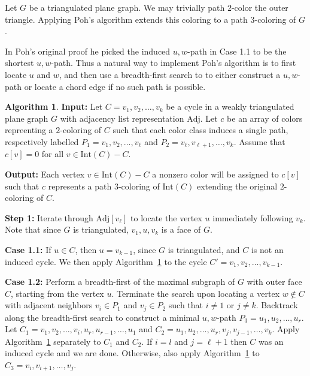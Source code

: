 \documentclass[12pt,letterpaper]{article}
\theoremstyle{plain}
\theoremstyle{definition}
\theoremstyle{break}
\newtheorem{algorithm}[lemma]{Algorithm}     %
\begin{document}
Let $G$ be a triangulated plane graph. We may trivially path $2$-color the outer
triangle. Applying Poh's algorithm extends this coloring to a path $3$-coloring
of $G$.

In Poh's original proof he picked the induced $u,w$-path in Case 1.1 to be the
shortest $u,w$-path.
Thus a natural way to implement Poh's algorithm is to first locate $u$ and $w$,
and then use a breadth-first search to
to either construct a $u,w$-path or locate
a chord edge if no such path is possible.

\begin{algorithm}\label{A:poh_bfs}
\textbf{Input:} Let $C=v_1,v_2,\ldots,v_k$ be a cycle in a weakly triangulated plane
graph $G$ with adjacency list representation $\text{Adj}$. Let 
$c$ be an array of colors repreenting a $2$-coloring of $C$ such
that each color class induces a single path, respectively labelled
$P_1=v_1,v_2,\ldots,v_\ell$ and $P_2=v_\ell,v_{\ell+1},\ldots,v_k$. Assume that
$c[v]=0$ for all $v\in\text{Int}(C)-C$.

\textbf{Output:} Each vertex $v\in\text{Int}(C)-C$ a nonzero color will be
assigned to $c[v]$ such that $c$ represents a path $3$-coloring of
$\text{Int}(C)$ extending the original $2$-coloring of $C$.

\textbf{Step 1:} Iterate through $\text{Adj}[v_\ell]$ to locate the vertex $u$
immediately following $v_k$. Note that since $G$ is triangulated, $v_1,u,v_k$ is
a face of $G$.

\textbf{Case 1.1:} If $u\in C$, then $u=v_{k-1}$, since $G$ is
triangulated, and $C$ is not an induced cycle. We then
apply Algorithm~\ref{A:poh_bfs} to the cycle $C'=v_1,v_2,\ldots,v_{k-1}$.

\textbf{Case 1.2:} Perform a breadth-first of the maximal subgraph of
$G$ with outer face $C$, starting from the
vertex $u$. Terminate the search upon locating a vertex $w\not\in C$ with adjacent
neighbors $v_i\in P_1$ and $v_j\in P_2$ such that $i\ne 1$ or $j\ne k$.
Backtrack along the breadth-first search
to construct a minimal $u,w$-path $P_3=u_1,u_2,\ldots,u_r$. Let
$C_1=v_1,v_2,\ldots,v_i,u_r,u_{r-1},\ldots,u_1$ and
$C_2=u_1,u_2,\ldots,u_r,v_j,v_{j-1},\ldots,v_k$. Apply Algorithm~\ref{A:poh_bfs}
separately to $C_1$ and $C_2$. If $i=l$ and $j={\ell+1}$ then $C$ was an induced
cycle and we are done. Otherwise, also apply Algorithm~\ref{A:poh_bfs} to
$C_3=v_i,v_{i+1},\ldots,v_j$.
\end{algorithm}
\end{document}
